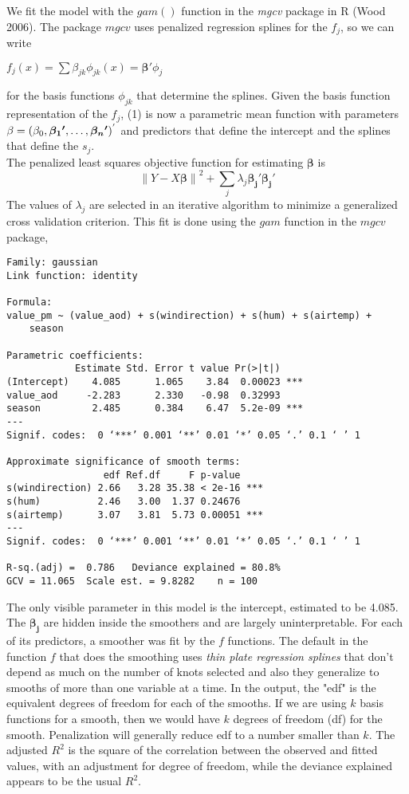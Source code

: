 \documentclass[10pt]{article}
\begin{document}
\begin{itemize}
We fit the model with the $gam()$ function in the {\textit{mgcv}} package in R (Wood 2006). The package ${mgcv}$ uses penalized regression splines for the $f_{j}$, so we can write
\begin{center} 
$f_{j}(x) = \sum \beta_{jk} {\phi_{jk}}(x) = {\bm{\beta{'}}}{\phi_j}$
\end{center} 
for the basis functions ${\phi_{jk}}$ that determine the splines. Given the basis function representation of the $f_j$, (1) is now a parametric mean function with parameters ${\bf{\beta}} = (\beta_0, {\bm{\beta_1{'}}}, \ldots, {\bm{\beta_n{'}}})^{'}$ and predictors that define the intercept and the splines that define the $s_j$.  \\
The penalized least squares objective function for estimating ${\bm{\beta}}$ is 
\begin{equation} 
{\lVert Y - X{\bm{\beta}}\rVert}^{2} + \sum_{j}\lambda_{j}{\bm{\beta_{j}{'}}}{\bm{\beta_{j}{'}}}
\end{equation}
The values of $\lambda_{j}$ are selected in an iterative algorithm to minimize a generalized cross validation criterion. This fit is done using the ${gam}$ function in the ${mgcv}$ package, 
\begin{verbatim}
Family: gaussian 
Link function: identity 

Formula:
value_pm ~ (value_aod) + s(windirection) + s(hum) + s(airtemp) + 
    season

Parametric coefficients:
            Estimate Std. Error t value Pr(>|t|)    
(Intercept)    4.085      1.065    3.84  0.00023 ***
value_aod     -2.283      2.330   -0.98  0.32993    
season         2.485      0.384    6.47  5.2e-09 ***
---
Signif. codes:  0 ‘***’ 0.001 ‘**’ 0.01 ‘*’ 0.05 ‘.’ 0.1 ‘ ’ 1

Approximate significance of smooth terms:
                 edf Ref.df     F p-value    
s(windirection) 2.66   3.28 35.38 < 2e-16 ***
s(hum)          2.46   3.00  1.37 0.24676    
s(airtemp)      3.07   3.81  5.73 0.00051 ***
---
Signif. codes:  0 ‘***’ 0.001 ‘**’ 0.01 ‘*’ 0.05 ‘.’ 0.1 ‘ ’ 1

R-sq.(adj) =  0.786   Deviance explained = 80.8%
GCV = 11.065  Scale est. = 9.8282    n = 100
\end{verbatim} 
The only visible parameter in this model is the intercept, estimated to be 4.085. The ${\bm{\beta_{j}}}$ are hidden inside the smoothers and are largely uninterpretable. For each of its predictors, a smoother was fit by the $f$ functions. The default in the function $f$ that does the smoothing uses {\textit{thin plate regression splines}} that don't depend as much on the number of knots selected and also they generalize to smooths of more than one variable at a time. In the output, the "edf" is the equivalent degrees of freedom for each of the smooths. If we are using $k$ basis functions for a smooth, then we would have $k$ degrees of freedom (df) for the smooth. Penalization will generally reduce edf to a number smaller than $k$. The adjusted $R^{2}$ is the square of the correlation between the observed and fitted values, with an adjustment for degree of freedom, while the deviance explained appears to be the usual $R^2$. 




\end{itemize}
\end{document}
